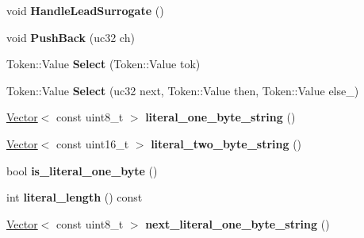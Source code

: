 \begin{DoxyCompactItemize}
\item 
void {\bfseries Handle\+Lead\+Surrogate} ()\hypertarget{classv8_1_1internal_1_1_scanner_ae24b5b571fd7ee062295a4899f2b74de}{}\label{classv8_1_1internal_1_1_scanner_ae24b5b571fd7ee062295a4899f2b74de}

\item 
void {\bfseries Push\+Back} (uc32 ch)\hypertarget{classv8_1_1internal_1_1_scanner_ab0e9f56dd10fa0b0cb9f1fb250e327b9}{}\label{classv8_1_1internal_1_1_scanner_ab0e9f56dd10fa0b0cb9f1fb250e327b9}

\item 
Token\+::\+Value {\bfseries Select} (Token\+::\+Value tok)\hypertarget{classv8_1_1internal_1_1_scanner_af23ecfec85288b9273ec9fbb7c19f566}{}\label{classv8_1_1internal_1_1_scanner_af23ecfec85288b9273ec9fbb7c19f566}

\item 
Token\+::\+Value {\bfseries Select} (uc32 next, Token\+::\+Value then, Token\+::\+Value else\+\_\+)\hypertarget{classv8_1_1internal_1_1_scanner_a5937e9d2c810cba0c28bfffc9882f3b8}{}\label{classv8_1_1internal_1_1_scanner_a5937e9d2c810cba0c28bfffc9882f3b8}

\item 
\hyperlink{classv8_1_1internal_1_1_vector}{Vector}$<$ const uint8\+\_\+t $>$ {\bfseries literal\+\_\+one\+\_\+byte\+\_\+string} ()\hypertarget{classv8_1_1internal_1_1_scanner_a1c4bbbd65222dcfde323449d76fde26c}{}\label{classv8_1_1internal_1_1_scanner_a1c4bbbd65222dcfde323449d76fde26c}

\item 
\hyperlink{classv8_1_1internal_1_1_vector}{Vector}$<$ const uint16\+\_\+t $>$ {\bfseries literal\+\_\+two\+\_\+byte\+\_\+string} ()\hypertarget{classv8_1_1internal_1_1_scanner_ad26bce630e84da16c0df9344481380c7}{}\label{classv8_1_1internal_1_1_scanner_ad26bce630e84da16c0df9344481380c7}

\item 
bool {\bfseries is\+\_\+literal\+\_\+one\+\_\+byte} ()\hypertarget{classv8_1_1internal_1_1_scanner_a23f37531c03e1d985b1bbbe299e30264}{}\label{classv8_1_1internal_1_1_scanner_a23f37531c03e1d985b1bbbe299e30264}

\item 
int {\bfseries literal\+\_\+length} () const \hypertarget{classv8_1_1internal_1_1_scanner_a4165dce85d0438b49289337cade2050b}{}\label{classv8_1_1internal_1_1_scanner_a4165dce85d0438b49289337cade2050b}

\item 
\hyperlink{classv8_1_1internal_1_1_vector}{Vector}$<$ const uint8\+\_\+t $>$ {\bfseries next\+\_\+literal\+\_\+one\+\_\+byte\+\_\+string} ()\hypertarget{classv8_1_1internal_1_1_scanner_ac8dfa1d8e001994244c145302802258e}{}\label{classv8_1_1internal_1_1_scanner_ac8dfa1d8e001994244c145302802258e}


\end{DoxyCompactItemize}
